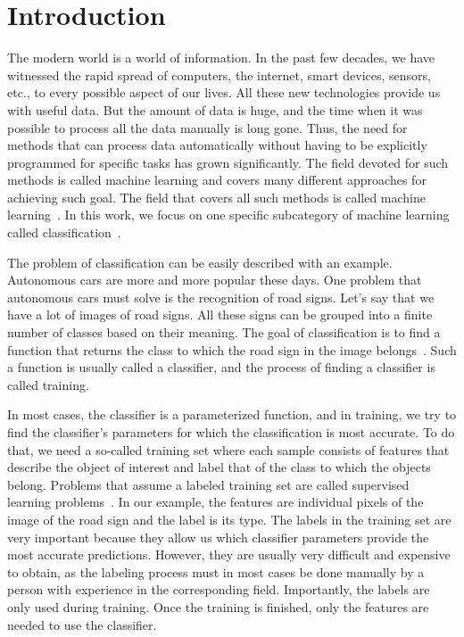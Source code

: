 \chapter*{Introduction}

The modern world is a world of information. In the past few decades, we have witnessed the rapid spread of computers, the internet, smart devices, sensors, etc., to every possible aspect of our lives. All these new technologies provide us with useful data. But the amount of data is huge, and the time when it was possible to process all the data manually is long gone. Thus, the need for methods that can process data automatically without having to be explicitly programmed for specific tasks has grown significantly. The field devoted for such methods is called machine learning and covers many different approaches for achieving such goal. The field that covers all such methods is called machine learning~\cite{mitchell1997machine}. In this work, we focus on one specific subcategory of machine learning called classification~\cite{aggarwal2021artificial}.

The problem of classification can be easily described with an example. Autonomous cars are more and more popular these days. One problem that autonomous cars must solve is the recognition of road signs. Let's say that we have a lot of images of road signs. All these signs can be grouped into a finite number of classes based on their meaning. The goal of classification is to find a function that returns the class to which the road sign in the image belongs~\cite{swaminathan2019autonomous}. Such a function is usually called a classifier, and the process of finding a classifier is called training.

In most cases, the classifier is a parameterized function, and in training, we try to find the classifier's parameters for which the classification is most accurate. To do that, we need a so-called training set where each sample consists of features that describe the object of interest and label that of the class to which the objects belong. Problems that assume a labeled training set are called supervised learning problems~\cite{aggarwal2021artificial}. In our example, the features are individual pixels of the image of the road sign and the label is its type. The labels in the training set are very important because they allow us which classifier parameters provide the most accurate predictions. However, they are usually very difficult and expensive to obtain, as the labeling process must in most cases be done manually by a person with experience in the corresponding field. Importantly, the labels are only used during training. Once the training is finished, only the features are needed to use the classifier.

